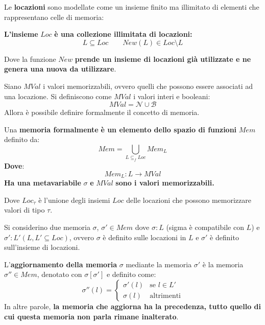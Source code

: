 \documentclass[a4paper]{article}
\begin{document}
 	Le \textbf{locazioni} sono modellate come un insieme finito ma illimitato di elementi che rappresentano celle di memoria:
 	\begin{boxdef}
 		\textbf{L'insieme} $Loc$ \textbf{è una collezione illimitata di locazioni:}
 		\begin{equation*}
 			L \subseteq Loc \hspace{2em} New\left(L\right) \in Loc \setminus L
 		\end{equation*}
 	\end{boxdef}
 	
 	\noindent
 	Dove la funzione $New$ \textbf{prende un insieme di locazioni già utilizzate e ne genera una nuova da utilizzare}.\newline
 	
 	\noindent
 	Siano $MVal$ i valori memorizzabili, ovvero quelli che possono essere associati ad una locazione. Si definiscono come $MVal$ i valori interi e booleani:
 	\begin{equation*}
 		MVal = \mathcal{N} \cup \mathcal{B}
 	\end{equation*}
 	Allora è possibile definire formalmente il concetto di memoria.
 	
 	\begin{boxdef}
 		Una \textcolor{Red3}{\textbf{memoria formalmente}} \textbf{è un elemento dello spazio di funzioni} $Mem$ definito da:
 		\begin{equation*}
 			Mem = \bigcup_{L\subseteq_{f} Loc} Mem_{L}
 		\end{equation*}
 		\textbf{Dove}:
 		\begin{equation*}
 			Mem_{L} : L \longrightarrow MVal
 		\end{equation*}
 		\textbf{Ha una metavariabile} $\sigma$ \textbf{e} $MVal$ \textbf{sono i valori memorizzabili.}
 	\end{boxdef}
 
 	\noindent
 	Dove $Loc_{\tau}$ è l'unione degli insiemi $Loc$ delle locazioni che possono memorizzare valori di tipo $\tau$.\newline
 	
 	\noindent
 	Si considerino due memoria $\sigma$, $\sigma' \in Mem$ dove $\sigma: L$ (sigma è compatibile con $L$) e $\sigma' : L' \left(L, L' \subseteq Loc\right)$, ovvero $\sigma$ è definito sulle locazioni in $L$ e $\sigma'$ è definito sull'insieme di locazioni.
 	
 	L'\textbf{aggiornamento della memoria} $\sigma$ mediante la memoria $\sigma'$ è la memoria $\sigma''\in Mem$, denotato con $\sigma\left[\sigma'\right]$ e definito come:
 	\begin{equation*}
 		\sigma''\left(l\right) = \begin{cases}
 			\sigma'\left(l\right)	& \text{se } l \in L' \\
 			\sigma\left(l\right)	& \text{altrimenti}
 		\end{cases}
 	\end{equation*}
 	In altre parole, \textbf{la memoria che aggiorna ha la precedenza, tutto quello di cui questa memoria non parla rimane inalterato}.\newpage
 	
\end{document}
